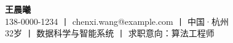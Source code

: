 {\Large\bfseries 王晨曦}\\[4pt]
138-0000-1234 丨 chenxi.wang@example.com 丨 中国·杭州\\
32岁 丨 数据科学与智能系统 丨 求职意向：算法工程师
